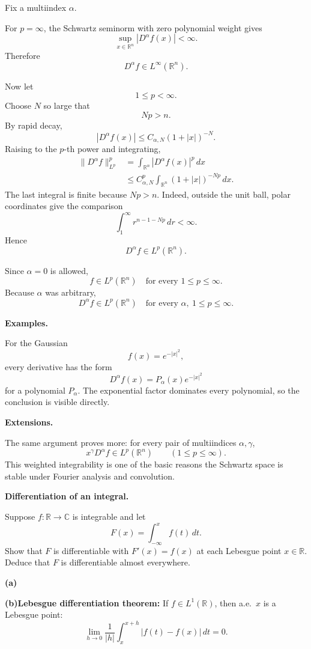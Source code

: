 \begin{solution}

Fix a multiindex \(\alpha\).

For \(p=\infty\), the Schwartz seminorm with zero polynomial weight gives
\[
\sup_{x\in\mathbb R^n}|D^\alpha f(x)|
<
\infty.
\]
Therefore
\[
D^\alpha f\in L^\infty(\mathbb R^n).
\]

Now let
\[
1\le p<\infty.
\]
Choose \(N\) so large that
\[
Np>n.
\]
By rapid decay,
\[
|D^\alpha f(x)|
\le
C_{\alpha,N}(1+|x|)^{-N}.
\]
Raising to the \(p\)-th power and integrating,
\[
\begin{aligned}
\|D^\alpha f\|_{L^p}^p
&=
\int_{\mathbb R^n}|D^\alpha f(x)|^p\,dx\\
&\le
C_{\alpha,N}^p
\int_{\mathbb R^n}
(1+|x|)^{-Np}\,dx.
\end{aligned}
\]
The last integral is finite because \(Np>n\). Indeed, outside the unit
ball, polar coordinates give the comparison
\[
\int_1^\infty r^{n-1-Np}\,dr<\infty.
\]
Hence
\[
D^\alpha f\in L^p(\mathbb R^n).
\]

Since \(\alpha=0\) is allowed,
\[
\boxed{
f\in L^p(\mathbb R^n)
\quad\text{for every }1\le p\le\infty.}
\]
Because \(\alpha\) was arbitrary,
\[
\boxed{
D^\alpha f\in L^p(\mathbb R^n)
\quad
\text{for every }\alpha,\ 1\le p\le\infty.}
\]

\medskip
\noindent\textbf{Examples.}

For the Gaussian
\[
f(x)=e^{-|x|^2},
\]
every derivative has the form
\[
D^\alpha f(x)
=
P_\alpha(x)e^{-|x|^2}
\]
for a polynomial \(P_\alpha\). The exponential factor dominates every
polynomial, so the conclusion is visible directly.

\medskip
\noindent\textbf{Extensions.}

The same argument proves more: for every pair of multiindices
\(\alpha,\gamma\),
\[
x^\gamma D^\alpha f
\in L^p(\mathbb R^n)
\qquad
(1\le p\le\infty).
\]
This weighted integrability is one of the basic reasons the Schwartz
space is stable under Fourier analysis and convolution.
\end{solution}


\begin{problem}[CP-II-0225]
\label{prob:cp-ii-0225}
\textbf{Differentiation of an integral.}

\hspace*{1.5em}Suppose $f:\mathbb{R}\to\mathbb{C}$ is integrable and let
\[
F(x)=\int_{-\infty}^{x} f(t)\,dt .
\]
Show that $F$ is differentiable with $F'(x)=f(x)$ at each Lebesgue point $x\in\mathbb{R}$.
Deduce that $F$ is differentiable almost everywhere.

 \par\smallskip\noindent\textbf{(a)}\quad 
	\par\smallskip\noindent\textbf{(b)}\quad \textbf{Lebesgue differentiation theorem:} If $f\in L^1(\mathbb{R})$, then a.e.\ $x$ is a Lebesgue point:
	\[
	\lim_{h\to0}\frac1{|h|}\int_{x}^{x+h}\!|f(t)-f(x)|\,dt=0.
	\]
\end{problem}

